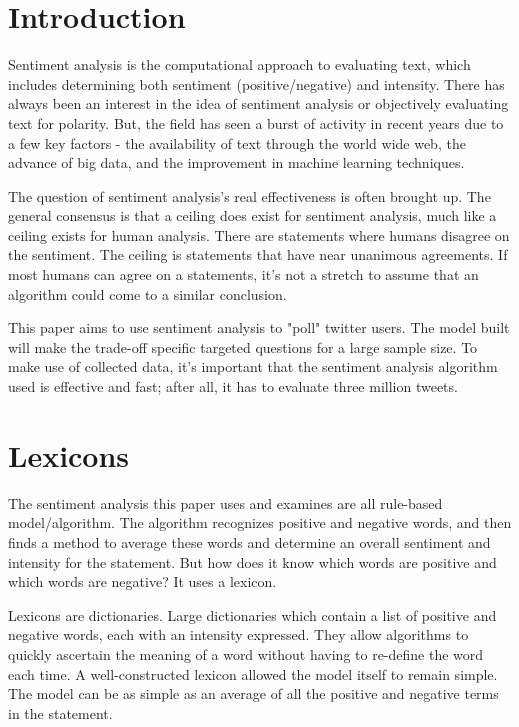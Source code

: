 \documentclass[11pt, twoside, reqno]{article}
\begin{document}
\label{label}
\section{Introduction}
\hspace{0.2in}Sentiment analysis is the computational approach to evaluating text, which includes determining both sentiment (positive/negative) and intensity. There has always been an interest in the idea of sentiment analysis or objectively evaluating text for polarity. But, the field has seen a burst of activity in recent years due to a few key factors - the availability of text through the world wide web, the advance of big data, and the improvement in machine learning techniques. 

The question of sentiment analysis's real effectiveness is often brought up. The general consensus is that a ceiling does exist for sentiment analysis, much like a ceiling exists for human analysis. There are statements where humans disagree on the sentiment. The ceiling is statements that have near unanimous agreements. If most humans can agree on a statements, it's not a stretch to assume that an algorithm could come to a similar conclusion. 

This paper aims to use sentiment analysis to "poll" twitter users. The model built will make the trade-off specific targeted questions for a large sample size. To make use of collected data, it's important that the sentiment analysis algorithm used is effective and fast; after all, it has to evaluate three million tweets. 

\section{Lexicons}
\hspace{0.2in}The sentiment analysis this paper uses and examines are all rule-based model/algorithm. 
The algorithm recognizes positive and negative words, and then finds a method to average these words and determine an overall sentiment and intensity for the statement. But how does it know which words are positive and which words are negative? It uses a lexicon. 

Lexicons are dictionaries. Large dictionaries which contain a list of positive and negative words, each with an intensity expressed. They allow algorithms to quickly ascertain the meaning of a word without having to re-define the word each time. A well-constructed lexicon allowed the model itself to remain simple. The model can be as simple as an average of all the positive and negative terms in the statement.
\end{document}
